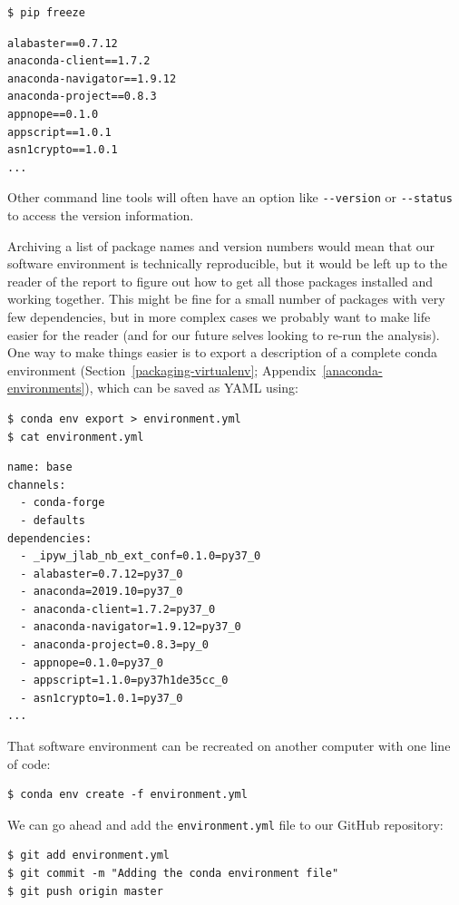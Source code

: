 \documentclass[
]{krantz}
\begin{document}
\begin{verbatim}
$ pip freeze
\end{verbatim}

\begin{verbatim}
alabaster==0.7.12
anaconda-client==1.7.2
anaconda-navigator==1.9.12
anaconda-project==0.8.3
appnope==0.1.0
appscript==1.0.1
asn1crypto==1.0.1
...
\end{verbatim}

Other command line tools will often have an option like \texttt{-\/-version} or \texttt{-\/-status}
to access the version information.

Archiving a list of package names and version numbers would mean that our
software environment is technically reproducible,
but it would be left up to the reader of the report
to figure out how to get all those packages installed and working together.
This might be fine for a small number of packages with very few dependencies,
but in more complex cases we probably want to make life easier for the reader
(and for our future selves looking to re-run the analysis).
One way to make things easier is to export a description of
a complete conda environment (Section~\ref{packaging-virtualenv};
Appendix~\ref{anaconda-environments}),
which can be saved as YAML using:

\begin{verbatim}
$ conda env export > environment.yml
$ cat environment.yml
\end{verbatim}

\begin{verbatim}
name: base
channels:
  - conda-forge
  - defaults
dependencies:
  - _ipyw_jlab_nb_ext_conf=0.1.0=py37_0
  - alabaster=0.7.12=py37_0
  - anaconda=2019.10=py37_0
  - anaconda-client=1.7.2=py37_0
  - anaconda-navigator=1.9.12=py37_0
  - anaconda-project=0.8.3=py_0
  - appnope=0.1.0=py37_0
  - appscript=1.1.0=py37h1de35cc_0
  - asn1crypto=1.0.1=py37_0
...
\end{verbatim}

That software environment can be recreated on another computer with one line of code:

\begin{verbatim}
$ conda env create -f environment.yml
\end{verbatim}

We can go ahead and add the \texttt{environment.yml} file to our GitHub repository:

\begin{verbatim}
$ git add environment.yml
$ git commit -m "Adding the conda environment file"
$ git push origin master
\end{verbatim}
\end{document}

